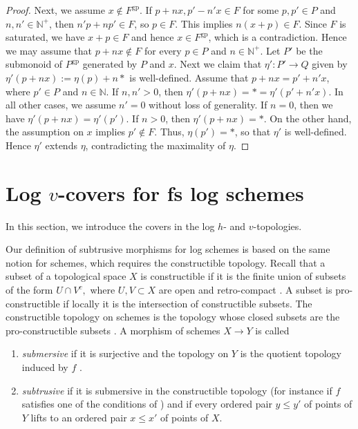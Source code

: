 \documentclass[10pt]{amsart}
\newcommand{\N}{\mathbb{N}}
\newcommand{\gp}{\mathrm{gp}}
\begin{document}
\begin{proof}
Next, we assume $x\notin F^\gp$.
If $p+nx,p'-n'x\in F$ for some $p,p'\in P$ and $n,n'\in \N^+$,
then $n'p+np'\in F$,
so $p\in F$.
This implies $n(x+p)\in F$.
Since $F$ is saturated,
we have $x+p\in F$ and hence $x\in F^\gp$,
which is a contradiction.
Hence we may assume that $p+nx\notin F$ for every $p\in P$ and $n\in \N^+$.
Let $P'$ be the submonoid of $P^\gp$ generated by $P$ and $x$.
Next we claim that $\eta'\colon P'\to Q$ given by $\eta'(p+nx):=\eta(p)+n\ast$ is well-defined.
Assume that $p+nx=p'+n'x$, where $p'\in P$ and $n\in \N$.
If $n,n'>0$,
then $\eta'(p+nx)=*=\eta'(p'+n'x)$.
In all other cases, we assume $n'=0$ without loss of generality.
If $n=0$,
then we have $\eta'(p+nx)=\eta'(p')$.
If $n>0$,
then $\eta'(p+nx)=*$.
On the other hand,
the assumption on $x$ implies $p'\notin F$.
Thus, $\eta(p')=*$, so that $\eta'$ is well-defined.
Hence $\eta'$ extends $\eta$,
contradicting the maximality of $\eta$.
\end{proof}








\section{Log \texorpdfstring{$v$}{v}-covers for fs log schemes}
\label{section:Log v-covers}
In this section, 
we introduce the covers in the log $h$- and $v$-topologies.

Our definition of subtrusive morphisms for log schemes is based on the same notion for schemes,
which requires the constructible topology.
Recall that a 
subset of a topological space $X$ is constructible if it is the finite union of subsets of the form 
$U \cap V^{c},$ where $U, V\subset X$ are open and retro-compact \cite[Tag 005G]{stacks-project}. 
A subset is pro-constructible if locally it is the intersection of constructible subsets.
The constructible topology on schemes is the topology whose closed subsets are the pro-constructible 
subsets \cite[§7.2]{EGA}.
A morphism of schemes $X \to Y$ is called
\begin{enumerate}
\item[(i)] \emph{submersive} if it is surjective and the topology on $Y$ is the quotient topology 
induced by $f$ \cite[p.\ 5]{Rydh}.
\item[(ii)] \emph{subtrusive} if it is submersive in the constructible topology 
(for instance if $f$ satisfies one of the conditions of \cite[Proposition 1.6]{Rydh}) and if
every ordered pair $y\leq y'$ of points of $Y$ lifts to an ordered pair $x\leq x'$ of points of $X$.
\end{enumerate}
\end{document}
